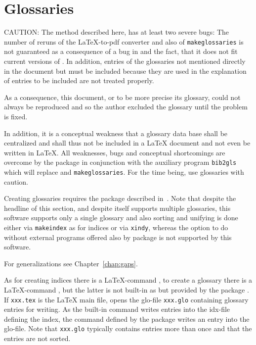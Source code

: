 \section{Glossaries}\label{sec:glossaries}

CAUTION\@: The method described here, 
has at least two severe bugs: 
The number of reruns of the \LaTeX-to-pdf converter and also of \texttt{makeglossaries} 
is not guaranteed as a consequence of a bug in  
and the fact, that it does not fit current versions of . 
In addition, entries of the glossaries not mentioned directly in the document 
but must be included because they are used in the explanation of entries to be included 
are not treated properly. 

As a consequence, this document, or to be more precise its glossary, 
could not always be reproduced and so the author excluded the glossary until the problem is fixed. 

In addition, it is a conceptual weakness that a glossary data base 
shall be centralized and shall thus not be included in a \LaTeX{} document 
and not even be written in \LaTeX. 
All weaknesses, bugs and conceptual shortcomings are overcome 
by the package  in conjunction with the auxiliary program \texttt{bib2gls} 
which will replace  and \texttt{makeglossaries}. 
For the time being, use glossaries with caution. 
\medskip


Creating glossaries 
requires the package  described in~\cite{GloP}. 
Note that despite the headline of this section, 
and despite  itself supports multiple glossaries, 
this software supports only a single glossary 
and also sorting and unifying is done 
either via \texttt{makeindex} as for indices or via \texttt{xindy}, 
whereas the option to do without external programs 
offered also by package  
is not supported by this software. 

For generalizations see Chapter~\ref{chap:gaps}. 

As for creating indices there is a \LaTeX-command , 
to create a glossary there is a \LaTeX-command , 
but the latter is not built-in as  
but provided by the package . 
If \texttt{xxx.tex} is the \LaTeX{} main file, 
 opens the glo-file \texttt{xxx.glo} 
containing glossary entries for writing. 
As the built-in command  
writes entries into the \gls{idx}-file defining the index, 
the command  defined by the package  
writes an entry into the glo-file. 
Note that \texttt{xxx.glo} typically contains entries more than once 
and that the entries are not sorted. 

